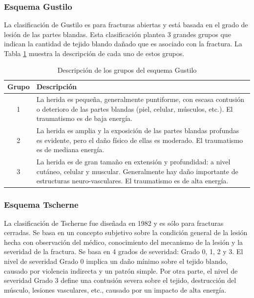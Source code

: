 \subsubsection{Esquema Gustilo}

La clasificaci\'on de Gustilo \cite{BROW03} es para fracturas abiertas y est\'a basada en el grado de lesi\'on de las partes blandas. Esta clasificaci\'on plantea 3 grandes grupos que indican la cantidad de tejido blando da\~nado que es asociado con la fractura. La Tabla \ref{tab:gustilo} muestra la descripci\'on de cada uno de estos grupos.

\begin{table}[htp]
\center
\begin{tabular}{|c| p{13cm}|}
\hline
Grupo & Descripci\'on \\ \hline
1 & La herida es peque\~na, generalmente puntiforme, con escasa contusi\'on o deterioro de las partes blandas (piel, celular, m\'usculos, etc.). El traumatismo es de baja energ\'ia. \\
\hline
2 & La herida es amplia y la exposici\'on de las partes blandas profundas es evidente, pero el da\~no f\'isico de ellas es moderado. El traumatismo es de mediana energ\'ia. \\
\hline
3 & La herida es de gran tama\~no en extensi\'on y profundidad: a nivel cut\'aneo, celular y muscular. Generalmente hay da\~no importante de estructuras neuro-vasculares. El traumatismo es de alta energ\'ia. \\ 
\hline
\end{tabular}
\caption{Descripci\'on  de los grupos del esquema Gustilo}
\label{tab:gustilo}
\end{table}

\subsubsection{Esquema Tscherne}

La clasificaci\'on de Tscherne \cite{STAN07} fue dise\~nada en 1982 y es s\'olo para fracturas cerradas. Se basa en un concepto subjetivo sobre la condici\'on general de la lesi\'on hecha con observaci\'on del m\'edico, conocimiento del mecanismo de la lesi\'on y la severidad de la fractura. Se basa en 4 grados de severidad: Grado 0, 1, 2 y 3. El nivel de severidad Grado 0 implica un da\~no m\'inimo sobre el tejido blando, causado por violencia indirecta y un patr\'on simple. Por otra parte, el nivel de severidad Grado 3 define una contusi\'on severa sobre el tejido, destrucci\'on del m\'usculo, lesiones vasculares, etc., causado por un impacto de alta energ\'ia.


